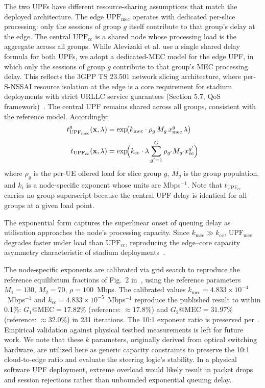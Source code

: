 \documentclass[conference]{IEEEtran}
\begin{document}
The two UPFs have different resource-sharing assumptions
that match the deployed architecture. The edge
$\text{UPF}_\text{mec}$ operates with dedicated
per-slice processing: only the sessions of group $g$
itself contribute to that group's delay at the edge.
The central $\text{UPF}_\text{cc}$ is a shared node
whose processing load is the aggregate across all groups.
While Alevizaki et al. use a single shared delay formula 
for both UPFs, we adopt a dedicated-MEC model for the edge 
UPF, in which only the sessions of group $g$ contribute to 
that group's MEC processing delay. This reflects the 3GPP 
TS 23.501 network slicing architecture, where per-S-NSSAI 
resource isolation at the edge is a core requirement for 
stadium deployments with strict URLLC service guarantees 
(Section 5.7, QoS framework)~\cite{3gpp_ts23501}. The 
central UPF remains shared across all groups, consistent 
with the reference model. Accordingly:
\begin{align}
    t_{\text{UPF}_\text{mec}}^g(\mathbf{x},\lambda)
      &= \exp\!\bigl(k_\text{mec}\cdot
         \rho_g\,M_g\,x_\text{mec}^g\,\lambda\bigr)
    \label{eq:upf_delay_mec} \\[4pt]
    t_{\text{UPF}_\text{cc}}(\mathbf{x},\lambda)
      &= \exp\!\Bigl(k_\text{cc}\cdot\lambda
         \sum_{g'=1}^{G}\rho_{g'} M_{g'}
         x_\text{cc}^{g'}\Bigr)
    \label{eq:upf_delay_cc}
\end{align}
where $\rho_g$ is the per-UE offered load for slice group
$g$, $M_g$ is the group population, and $k_i$ is a
node-specific exponent whose units are Mbps$^{-1}$.
Note that $t_{\text{UPF}_\text{cc}}$ carries no group
superscript because the central UPF delay is identical
for all groups at a given load point.

The exponential form captures the superlinear onset of
queuing delay as utilisation approaches the node's
processing capacity. Since $k_\text{mec} \gg k_\text{cc}$,
$\text{UPF}_\text{mec}$ degrades faster under load than
$\text{UPF}_\text{cc}$, reproducing the edge--core
capacity asymmetry characteristic of stadium
deployments~\cite{nokia_live_events}.

The node-specific exponents are calibrated via grid search
to reproduce the reference equilibrium fractions of Fig.~2
in~\cite{Alevizaki2021upf}, using the reference parameters
$M_1=130$, $M_2=70$, $\rho=100$~Mbps. The calibrated
values $k_\text{mec} = 4.833\times10^{-4}$~Mbps$^{-1}$
and $k_\text{cc} = 4.833\times10^{-5}$~Mbps$^{-1}$
reproduce the published result to within 0.1\%:
$G_1\text{@MEC} = 17.82\%$ (reference: $\approx 17.8\%$)
and $G_2\text{@MEC} = 31.97\%$ (reference: $\approx 32.0\%$)
in 231 iterations. The 10:1 exponent ratio is preserved
per~\cite{Alevizaki2021upf}. Empirical validation against
physical testbed measurements is left for future work.
We note that these $k$ parameters, originally derived from 
optical switching hardware, are utilized here as generic capacity 
constraints to preserve the 10:1 cloud-to-edge ratio and evaluate 
the steering logic's stability. In a physical software UPF deployment, 
extreme overload would likely result in packet drops and session 
rejections rather than unbounded exponential queuing delay.
\end{document}
